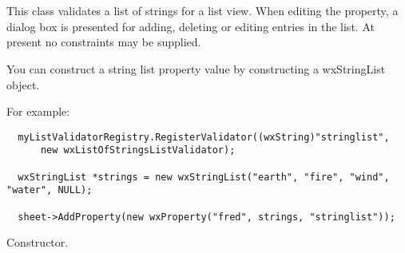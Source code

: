 \section{}\label{wxlistofstringslistvalidator}


This class validates a list of strings for a list view. When editing the property,
a dialog box is presented for adding, deleting or editing entries in the list.
At present no constraints may be supplied.

You can construct a string list property value by constructing a wxStringList object.

For example:

\begin{verbatim}
  myListValidatorRegistry.RegisterValidator((wxString)"stringlist",
      new wxListOfStringsListValidator);

  wxStringList *strings = new wxStringList("earth", "fire", "wind", "water", NULL);

  sheet->AddProperty(new wxProperty("fred", strings, "stringlist"));
\end{verbatim}



Constructor.

